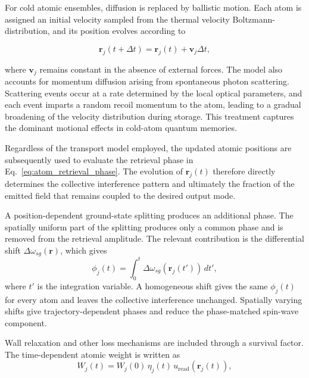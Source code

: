 For cold atomic ensembles, diffusion is replaced by ballistic motion. Each atom is assigned an initial velocity sampled from the thermal velocity Boltzmann-distribution, and its position evolves according to

\begin{equation}
    \mathbf{r}_j(t+\Delta t)
    =
    \mathbf{r}_j(t)
    +
    \mathbf{v}_j\Delta t,
    \label{eq:ballistic_position_update}
\end{equation}

where $\mathbf{v}_j$ remains constant in the absence of external forces. The model also accounts for momentum diffusion arising from spontaneous photon scattering. Scattering events occur at a rate determined by the local optical parameters, and each event imparts a random recoil momentum to the atom, leading to a gradual broadening of the velocity distribution during storage. This treatment captures the dominant motional effects in cold-atom quantum memories.

Regardless of the transport model employed, the updated atomic positions are subsequently used to evaluate the retrieval phase in Eq.~\eqref{eq:atom_retrieval_phase}. The evolution of $\mathbf{r}_j(t)$ therefore directly determines the collective interference pattern and ultimately the fraction of the emitted field that remains coupled to the desired output mode.

A position-dependent ground-state splitting produces an additional phase. The spatially uniform part of the splitting produces only a common phase and is removed from the retrieval amplitude. The relevant contribution is the differential shift $\Delta\omega_{sg}(\mathbf{r})$, which gives
\begin{equation}
    \phi_j(t)
    =
    \int_0^t
    \Delta\omega_{sg}\!\left(\mathbf{r}_j(t')\right)
    \,dt',
    \label{eq:internal_phase_integral}
\end{equation}
where $t'$ is the integration variable. A homogeneous shift gives the same $\phi_j(t)$ for every atom and leaves the collective interference unchanged. Spatially varying shifts give trajectory-dependent phases and reduce the phase-matched spin-wave component.

Wall relaxation and other loss mechanisms are included through a survival factor. The time-dependent atomic weight is written as
\begin{equation}
    W_j(t)
    =
    W_j(0)
    \,
    \eta_j(t)
    \,
    u_{\mathrm{read}}\!\left(\mathbf{r}_j(t)\right),
    \label{eq:time_dependent_weight}
\end{equation}

